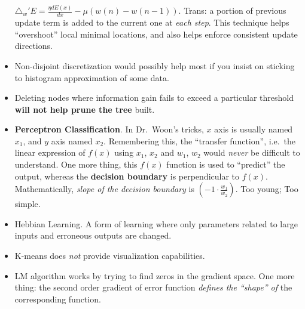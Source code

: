 \documentclass[twocolumn]{article}
\begin{document}
\begin{itemize}
  $\triangle_{w}'E=\frac{\eta dE(x)}{dx}-\mu(w(n)-w(n-1))$. Trans: a
  portion of previous update term is added to the current one at
  \emph{each step}. This technique helps ``overshoot'' local minimal
  locations, and also helps enforce consistent update directions.
\item Non-disjoint discretization would possibly help most if you
  insist on sticking to histogram approximation of some data.
\item Deleting nodes where information gain fails to exceed a
  particular threshold \textbf{will not help prune the tree} built.
\item \textbf{Perceptron Classification}. In Dr.\ Woon's tricks, $x$
  axis is usually named $x_{1}$, and $y$ axis named
  $x_{2}$. Remembering this, the ``transfer function'', i.e.\ the
  linear expression of $f(x)$ using $x_{1}$, $x_{2}$ and $w_{1}$,
  $w_{2}$ would \emph{never} be difficult to understand. One more
  thing, this $f(x)$ function is used to ``predict'' the output,
  whereas the \textbf{decision boundary} is perpendicular to
  $f(x)$. Mathematically, \emph{slope of the decision boundary} is
  $(-1\cdot \frac{w_{1}}{w_{2}})$. Too young; Too simple.
\item Hebbian Learning. A form of learning where only parameters
  related to large inputs and erroneous outputs are changed. 
\item K-means does \emph{not} provide visualization capabilities.
\item LM algorithm works by trying to find zeros in the gradient
  space. One more thing: the second order gradient of error function
  \emph{defines the ``shape'' of} the corresponding function.
\end{itemize}
\end{document}
